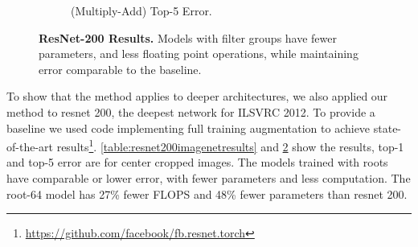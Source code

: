 \documentclass[thesis]{subfiles}
\begin{document}
\begin{figure}[tbp]
\begin{subfigure}[b]{\textwidth}
			\centering
			\caption{ (Multiply-Add) \vs Top-5 Error.}
			\label{fig:resnet200ma}
		\end{subfigure}
		\caption[ResNet-200  results]{\textbf{ResNet-200  Results.} Models with filter groups have fewer parameters, and less floating point operations, while maintaining error comparable to the baseline.}
		\label{fig:resnet200plots}
	\end{figure}
	To show that the method applies to deeper architectures, we also applied our method to \gls{resnet} 200, the deepest network for ILSVRC 2012. To provide a baseline we used code implementing full training augmentation to achieve state-of-the-art results\footnote{\url{https://github.com/facebook/fb.resnet.torch}}. \cref{table:resnet200imagenetresults} and \cref{fig:resnet200plots} show the results, top-1 and top-5 error are for center cropped images. The models trained with roots have comparable or lower error, with fewer parameters and less computation. The root-64 model has 27\% fewer FLOPS and 48\% fewer parameters than \gls{resnet} 200.
\end{document}

